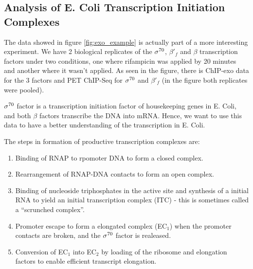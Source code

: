 \documentclass[11pt]{article}\usepackage[]{graphicx}\usepackage[]{color}
\begin{document}
\subsection{Analysis of E. Coli Transcription Initiation Complexes}
\label{sec:ecoli}

The data showed in figure \ref{fig:exo_example} is actually part of a
more interesting experiment. We have 2 biological replicates of the
$\sigma^{70}$, $\beta'_f$ and $\beta$ transcription factors under two
conditions, one where rifampicin was applied by 20 minutes and another
where it wasn't applied. As seen in the figure, there is ChIP-exo data
for the 3 factors and PET ChIP-Seq for $\sigma^{70}$ and $\beta'_f$ (in the
figure both replicates were pooled).

$\sigma^{70}$ factor is a transcription initiation factor of housekeeping
genes in E. Coli, and both $\beta$ factors transcribe the DNA into
mRNA. Hence, we want to use this data to have a better understanding
of the transcription in E. Coli.

The steps in formation of productive transcription complexes are:

\begin{enumerate}
\item Binding of RNAP to rpomoter DNA to form a closed complex.
\item Rearrangement of RNAP-DNA contacts to form an open complex.
\item Binding of nucleoside triphosphates in the active site and
  synthesis of a initial RNA to yield an initial transcription complex
  (ITC) - this is sometimes called a ``scrunched complex''.
\item Promoter escape to form a elongated complex (EC$_1$) when the
  promoter contacts are broken, and the $\sigma^{70}$ factor is realeased.
\item Conversion of EC$_1$ into EC$_2$ by loading of the ribosome and
  elongation factors to enable efficient transcript elongation.
\end{enumerate}

\end{document}
